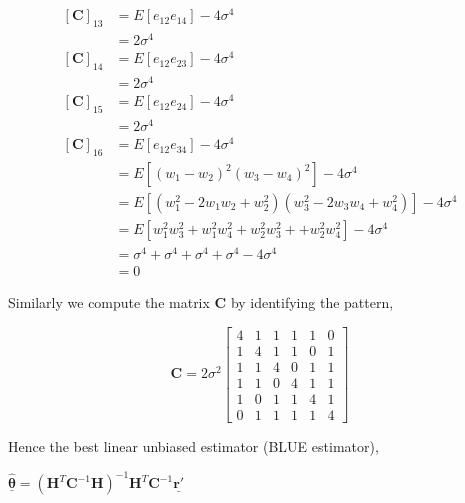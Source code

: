 \documentclass[a4 paper]{article}
\begin{document}
\begin{align*}
\\ [\mathbf{C}]_{13} &= E[e_{12}e_{14}] -4\sigma^{4}
\\ &= 2\sigma^{4}
\\ [\mathbf{C}]_{14} &= E[e_{12}e_{23}] -4\sigma^{4}
\\ &= 2\sigma^{4}
\\ [\mathbf{C}]_{15} &= E[e_{12}e_{24}] -4\sigma^{4}
\\ &= 2\sigma^{4}
\\ [\mathbf{C}]_{16} &= E[e_{12}e_{34}] -4\sigma^{4}
\\ &= E[(w_{1}-w_{2})^{2}(w_{3}-w_{4})^{2}] -4\sigma^{4}
\\ &= E[(w_{1}^{2}-2w_{1}w_{2}+w_{2}^{2})(w_{3}^{2}-2w_{3}w_{4}+w_{4}^{2})] -4\sigma^{4}
\\ &= E[w_{1}^{2}w_{3}^{2}+w_{1}^{2}w_{4}^{2}+w_{2}^{2}w_{3}^{2}++w_{2}^{2}w_{4}^{2}]  -4\sigma^{4}
\\ &= \sigma^{4}+\sigma^{4}+\sigma^{4}+\sigma^{4} -4\sigma^{4}
\\ &= 0
\end{align*}

Similarly we compute the matrix $\mathbf{C}$ by identifying the pattern, 

\[
\mathbf{C} = 
2\sigma^{2}
\begin{bmatrix}
4 & 1 & 1 & 1 & 1 & 0 \\
1 & 4 & 1 & 1 & 0 & 1 \\
1 & 1 & 4 & 0 & 1 & 1 \\
1 & 1 & 0 & 4 & 1 & 1 \\
1 & 0 & 1 & 1 & 4 & 1 \\
0 & 1 & 1 & 1 & 1 & 4
\end{bmatrix}
\]

Hence the best linear unbiased estimator (BLUE estimator),
\\ \centerline{$\hat{\mathbf{\underline{\theta}}} = (\mathbf{H}^{T}\mathbf{C}^{-1}\mathbf{H})^{-1}\mathbf{H}^{T}\mathbf{C}^{-1} \mathbf{\underline{r'}}$}
\end{document}

